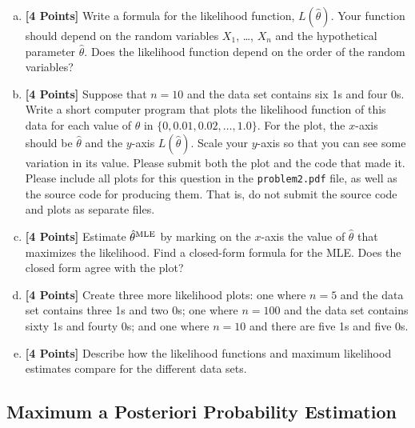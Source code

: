 \documentclass{article}
\newcommand \mle [1]{{\hat #1}^{\rm MLE}}
\newcommand \code [1]{{\tt #1}}
\begin{document}
\begin{enumerate}[(a)]
\item {\bf [4 Points]} Write a formula for the likelihood function,
  $L(\hat \theta)$.  Your function should depend on the random
  variables $X_1$, \dots, $X_n$ and the hypothetical parameter
  $\hat \theta$. Does the likelihood function depend on the order of
  the random variables?

\item {\bf [4 Points]} Suppose that $n = 10$ and the data set contains
  six 1s and four 0s. Write a short computer program that plots the
  likelihood function of this data for each value of $\hat \theta $ in
  $\{0, 0.01, 0.02, \dots, 1.0\}$. For the plot, the $x$-axis should
  be $\hat \theta$ and the $y$-axis $L(\hat \theta)$. Scale your
  $y$-axis so that you can see some variation in its value. Please
  submit both the plot and the code that made it. Please include all
  plots for this question in the \code{problem2.pdf} file, as well as
  the source code for producing them. That is, do not submit the
  source code and plots as separate files.

\item {\bf [4 Points]} Estimate $\mle{\theta}$ by marking on the
  $x$-axis the value of $\hat \theta$ that maximizes the
  likelihood. Find a closed-form formula for the MLE. Does the closed
  form agree with the plot?
  
\item {\bf [4 Points]} Create three more likelihood plots: one where
  $n = 5$ and the data set contains three 1s and two 0s; one where
  $n = 100$ and the data set contains sixty 1s and fourty 0s; and one
  where $n = 10$ and there are five 1s and five 0s.

\item {\bf [4 Points]} Describe how the likelihood functions and
  maximum likelihood estimates compare for the different data sets.

\end{enumerate}

\subsection*{Maximum a Posteriori Probability Estimation}
\end{document}

